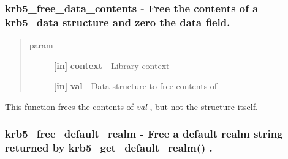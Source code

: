 \documentclass[letterpaper,10pt,english]{sphinxmanual}
\begin{document}
\subsubsection{krb5\_free\_data\_contents -  Free the contents of a krb5\_data structure and zero the data field.}
\label{appdev/refs/api/krb5_free_data_contents:krb5-free-data-contents-free-the-contents-of-a-krb5-data-structure-and-zero-the-data-field}\label{appdev/refs/api/krb5_free_data_contents::doc}

\begin{fulllineitems}
\label{appdev/refs/api/krb5_free_data_contents:krb5_free_data_contents}
\end{fulllineitems}

\begin{quote}\begin{description}
\item[{param}] \leavevmode
\textbf{{[}in{]}} \textbf{context} - Library context

\textbf{{[}in{]}} \textbf{val} - Data structure to free contents of

\end{description}\end{quote}

This function frees the contents of \emph{val} , but not the structure itself.


\subsubsection{krb5\_free\_default\_realm -  Free a default realm string returned by krb5\_get\_default\_realm() .}
\label{appdev/refs/api/krb5_free_default_realm:krb5-free-default-realm-free-a-default-realm-string-returned-by-krb5-get-default-realm}\label{appdev/refs/api/krb5_free_default_realm::doc}

\begin{fulllineitems}
\label{appdev/refs/api/krb5_free_default_realm:krb5_free_default_realm}
\end{fulllineitems}
\end{document}
